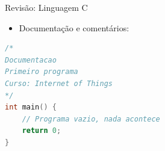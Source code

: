 \begin{frame}[fragile]{Revisão: Linguagem C}
    \begin{itemize}
        \item Documentação e comentários:
    \end{itemize}

\begin{lstlisting}[language=C]
/*
Documentacao
Primeiro programa
Curso: Internet of Things
*/
int main() {
    // Programa vazio, nada acontece
    return 0;
}
\end{lstlisting}

\end{frame}
